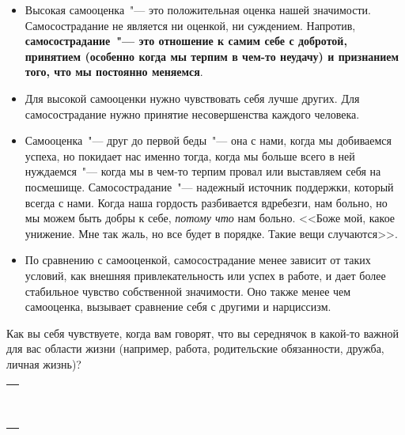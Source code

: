 \begin{itemize}
	\item Высокая самооценка~"--- это положительная оценка нашей значимости. Самосострадание не является ни оценкой, ни суждением. Напротив, \textbf{самосострадание~"--- это отношение к самим себе с добротой, принятием (особенно когда мы терпим в чем-то неудачу) и признанием того, что мы постоянно меняемся}.
	\item Для высокой самооценки нужно чувствовать себя лучше других. Для самосострадание нужно принятие несовершенства каждого человека.
	\item Самооценка~"--- друг до первой беды~"--- она с нами, когда мы добиваемся успеха, но покидает нас именно тогда, когда мы больше всего в ней нуждаемся~"--- когда мы в чем-то терпим провал или выставляем себя на посмешище. Самосострадание~"--- надежный источник поддержки, который всегда с нами. Когда наша гордость разбивается вдребезги, нам больно, но мы можем быть добры к себе, \emph{потому что} нам больно. <<Боже мой, какое унижение. Мне так жаль, но все будет в порядке. Такие вещи случаются>>.
	\item По сравнению с самооценкой, самосострадание менее зависит от таких условий, как внешняя привлекательность или успех в работе, и дает более стабильное чувство собственной значимости. Оно также менее чем самооценка, вызывает сравнение себя с другими и нарциссизм.
\end{itemize}

\newpage
{}

\begin{itemize}
	\itemWritingHand Как вы себя чувствуете, когда вам говорят, что вы середнячок в какой-то важной для вас области жизни (например, работа, родительские обязанности, дружба, личная жизнь)?
\end{itemize}

\setlength{\extrarowheight}{2mm}
\begin{tabularx}{\textwidth}{X}
	\\
	\arrayrulecolor{gray}\hline\\
	\hline\\
	\hline\\
	\hline\\
	\hline\\
	\hline\\
	\hline\\
	\hline\\	
	\hline\\
	\hline\\
\end{tabularx}
\setlength{\extrarowheight}{0mm}

